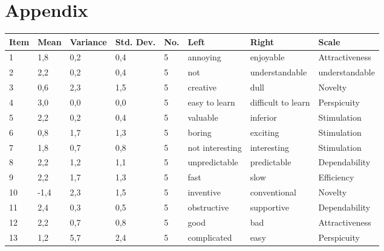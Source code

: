 \documentclass[conference,onecolumn]{IEEEtran}
\begin{document}
\newpage
\section*{Appendix}

    \begin{table}[H]	
        \begin{center}
            \begin{tabular}[H]{ |m{1cm}|m{1cm}|m{1.2cm}|m{1.2cm}|m{1cm}|m{2cm}|m{3cm}|m{2cm}|}
                \hline
                \textbf{Item}&\textbf{Mean} &\textbf{Variance} &\textbf{Std. Dev.}  &\textbf{No.}  &\textbf{Left} &\textbf{Right} &\textbf{Scale}\\ \hline
                1	&1,8	&0,2	&0,4	&5	&annoying	            &enjoyable	                &Attractiveness             \\ \hline
                2	&2,2	&0,2	&0,4	&5	&not                    &understandable	            &understandable         \\ \hline
                3	&0,6	&2,3	&1,5	&5	&creative	            &dull	                    &Novelty        \\ \hline
                4	&3,0	&0,0	&0,0	&5	&easy to learn	        &difficult to learn	        &Perspicuity        \\ \hline
                5	&2,2	&0,2	&0,4	&5	&valuable	            &inferior	                &Stimulation        \\ \hline
                6	&0,8	&1,7	&1,3	&5	&boring	                &exciting	                &Stimulation        \\ \hline
                7	&1,8	&0,7	&0,8	&5	&not interesting	    &interesting	            &Stimulation        \\ \hline
                8	&2,2	&1,2	&1,1	&5	&unpredictable	        &predictable	            &Dependability      \\ \hline
                9	&2,2	&1,7	&1,3	&5	&fast	                &slow	                    &Efficiency     \\ \hline
                10	&-1,4	&2,3	&1,5	&5	&inventive	            &conventional	            &Novelty        \\ \hline
                11	&2,4	&0,3	&0,5	&5	&obstructive	        &supportive	                &Dependability      \\ \hline
                12	&2,2	&0,7	&0,8	&5	&good	                &bad	                    &Attractiveness     \\ \hline
                13	&1,2	&5,7	&2,4	&5	&complicated	        &easy	                    &Perspicuity        \\ \hline

\end{tabular}
\end{center}
\end{table}
\end{document}
